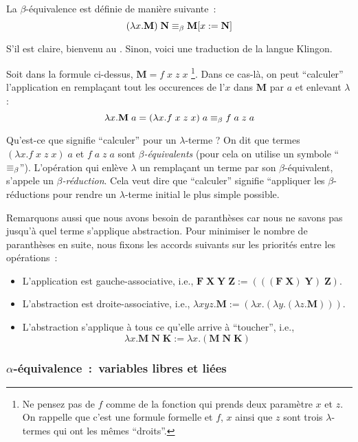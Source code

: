 \begin{definition}
La $\beta$-équivalence est définie de manière suivante~:
	$$(\lambda x.\mathbf{M}) \; \mathbf{N} \equiv_\beta \mathbf{M}[x:=\mathbf{N}]$$
\end{definition}
S'il est claire, bienvenu au .
Sinon, voici une traduction de la langue Klingon.

Soit dans la formule ci-dessus, $\mathbf{M} = f \; x \; z \; x$
\footnote{
	Ne pensez pas de $f$ comme de la fonction qui prends deux paramètre $x$ et $z$. On rappelle que c'est une formule formelle et $f$, $x$ ainsi que $z$ sont trois $\lambda$-termes qui ont les mêmes ``droits''.
}.
Dans ce cas-là, on peut ``calculer'' l'application en remplaçant tout les occurences de l'$x$ dans $\mathbf{M}$ par $a$ et enlevant $\lambda$ :
$$\lambda x. \mathbf{M} \; a = (\lambda x. f \; x \; z \; x) \; a \equiv_\beta f \; a \; z \; a$$

Qu'est-ce que signifie ``calculer'' pour un $\lambda$-terme ?
On dit que termes $(\lambda x. f \; x \; z \; x) \; a$ et $f \; a \; z \; a$ sont \emph{$\beta$-équivalents} (pour cela on utilise un symbole ``$\equiv_\beta$'').
L'opération qui enlève $\lambda$ un remplaçant un terme par son $\beta$-équivalent, s'appele un \emph{$\beta$-réduction}.
Cela veut dire que ``calculer'' signifie ``appliquer les $\beta$-réductions pour rendre un $\lambda$-terme initial le plus simple possible.

Remarquons aussi que nous avons besoin de paranthèses car nous ne savons pas jusqu'à quel terme s'applique abstraction.
Pour minimiser le nombre de paranthèses en suite, nous fixons les accords suivants sur les priorités entre les opérations~:
\begin{itemize}
	\item L'application est gauche-associative, i.e.,
	$\mathbf{F \; X \; Y \; Z := (((F \; X) \; Y) \; Z)}$.
	\item L'abstraction est droite-associative, i.e., $\lambda x y z. \mathbf{M} := (\lambda x.(\lambda y.(\lambda z. \mathbf{M})))$.
	\item L'abstraction s'applique à tous ce qu'elle arrive à ``toucher'', i.e., $$\lambda x. \mathbf{M \; N \; K} := \lambda x.(\mathbf{M \; N \; K})$$
\end{itemize}

\subsubsection*{$\alpha$-équivalence~:~variables libres et liées} \label{variables-libres-et-liees}

